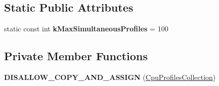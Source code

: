 \subsection*{Static Public Attributes}
\begin{DoxyCompactItemize}
\item 
static const int {\bfseries k\+Max\+Simultaneous\+Profiles} = 100\hypertarget{classv8_1_1internal_1_1_cpu_profiles_collection_a3c8efd32f53f7fa8fe100cc188d60be7}{}\label{classv8_1_1internal_1_1_cpu_profiles_collection_a3c8efd32f53f7fa8fe100cc188d60be7}

\end{DoxyCompactItemize}
\subsection*{Private Member Functions}
\begin{DoxyCompactItemize}
\item 
{\bfseries D\+I\+S\+A\+L\+L\+O\+W\+\_\+\+C\+O\+P\+Y\+\_\+\+A\+N\+D\+\_\+\+A\+S\+S\+I\+GN} (\hyperlink{classv8_1_1internal_1_1_cpu_profiles_collection}{Cpu\+Profiles\+Collection})\hypertarget{classv8_1_1internal_1_1_cpu_profiles_collection_a943a5725dd48543d0b9bf72a4df932b2}{}\label{classv8_1_1internal_1_1_cpu_profiles_collection_a943a5725dd48543d0b9bf72a4df932b2}

\end{DoxyCompactItemize}
